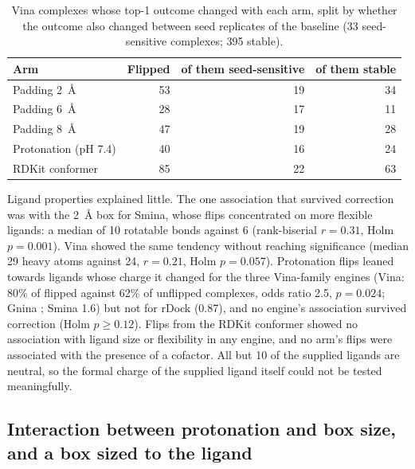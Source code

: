 \begin{table}[h]
  \centering
  \caption{Vina complexes whose top-1 outcome changed with each arm, split by whether
    the outcome also changed between seed replicates of the baseline (33 seed-sensitive
    complexes; 395 stable).}
  \label{tab:stable-flips}
  \begin{tabular}{lrrr}
    \toprule
    Arm & Flipped & of them seed-sensitive & of them stable \\
    \midrule
    Padding \SI{2}{\angstrom} & 53 & 19 & 34 \\
    Padding \SI{6}{\angstrom} & 28 & 17 & 11 \\
    Padding \SI{8}{\angstrom} & 47 & 19 & 28 \\
    Protonation (pH 7.4) & 40 & 16 & 24 \\
    RDKit conformer & 85 & 22 & 63 \\
    \bottomrule
  \end{tabular}
\end{table}

Ligand properties explained little. The one association that survived correction was with
the \SI{2}{\angstrom} box for Smina, whose flips concentrated on more flexible ligands: a
median of 10 rotatable bonds against 6 (rank-biserial $r = 0.31$, Holm $p = 0.001$). Vina
showed the same tendency without reaching significance (median 29 heavy atoms against 24,
$r = 0.21$, Holm $p = 0.057$). Protonation flips leaned towards ligands whose charge it
changed for the three Vina-family engines (Vina: 80\% of flipped against 62\% of unflipped
complexes, odds ratio 2.5, $p = 0.024$; Gnina ; Smina 1.6) but not for rDock (0.87),
and no engine's association survived correction (Holm $p \ge 0.12$). Flips from the RDKit conformer showed no association with ligand size
or flexibility in any engine, and no arm's flips were associated with the presence of a
cofactor. All but 10 of the supplied ligands are neutral, so the formal charge of the
supplied ligand itself could not be tested meaningfully.

\subsection{Interaction between protonation and box size, and a box sized to the ligand}
\label{sec:interaction}

